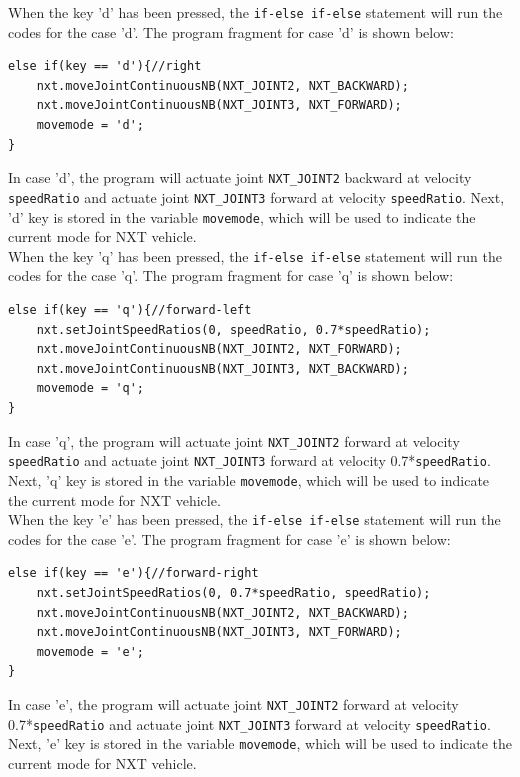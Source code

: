 \documentclass[11pt]{article}
\begin{document}
When the key 'd' has been pressed, the \verb+if-else if-else+ statement will run the codes for the case 'd'.
The program fragment for case 'd' is shown below:
\begin{lstlisting}
else if(key == 'd'){//right
    nxt.moveJointContinuousNB(NXT_JOINT2, NXT_BACKWARD);
    nxt.moveJointContinuousNB(NXT_JOINT3, NXT_FORWARD);
    movemode = 'd';
}
\end{lstlisting}
In case 'd', the program will actuate joint \verb+NXT_JOINT2+ backward at velocity \verb+speedRatio+ 
and actuate joint \verb+NXT_JOINT3+ forward at velocity \verb+speedRatio+. Next, 'd' key is stored in
the variable \verb+movemode+, which will be used to indicate the current mode for NXT vehicle.\\ 
\newline
When the key 'q' has been pressed, the \verb+if-else if-else+ statement will run the codes for the case 'q'.
The program fragment for case 'q' is shown below:
\begin{lstlisting}
else if(key == 'q'){//forward-left
    nxt.setJointSpeedRatios(0, speedRatio, 0.7*speedRatio);
    nxt.moveJointContinuousNB(NXT_JOINT2, NXT_FORWARD);
    nxt.moveJointContinuousNB(NXT_JOINT3, NXT_BACKWARD);
    movemode = 'q';
}
\end{lstlisting}
In case 'q', the program will actuate joint \verb+NXT_JOINT2+ forward at velocity \verb+speedRatio+ 
and actuate joint \verb+NXT_JOINT3+ forward at velocity 0.7*\verb+speedRatio+. Next, 'q' key is 
stored in the variable \verb+movemode+, which will be used to indicate the current mode for NXT 
vehicle.\\ 
\newline
When the key 'e' has been pressed, the \verb+if-else if-else+ statement will run the codes for the case 'e'.
The program fragment for case 'e' is shown below:
\begin{lstlisting}
else if(key == 'e'){//forward-right
    nxt.setJointSpeedRatios(0, 0.7*speedRatio, speedRatio);
    nxt.moveJointContinuousNB(NXT_JOINT2, NXT_BACKWARD);
    nxt.moveJointContinuousNB(NXT_JOINT3, NXT_FORWARD);
    movemode = 'e';
}
\end{lstlisting}
In case 'e', the program will actuate joint \verb+NXT_JOINT2+ forward at velocity 
0.7*\verb+speedRatio+ and actuate joint \verb+NXT_JOINT3+ forward at velocity 
\verb+speedRatio+. Next, 'e' key is stored in the variable \verb+movemode+, which will 
be used to indicate the current mode for NXT vehicle.\\ 
\end{document}
